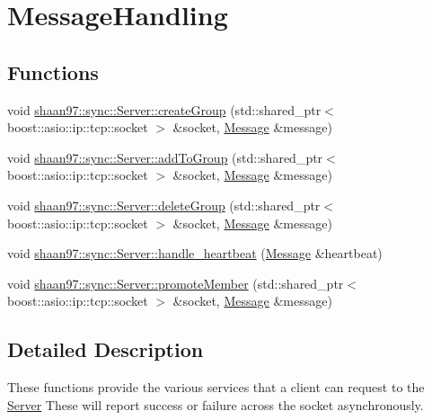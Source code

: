 \hypertarget{group___message_handling}{}\section{Message\+Handling}
\label{group___message_handling}
\subsection*{Functions}
\begin{DoxyCompactItemize}
\item 
void \hyperlink{group___message_handling_ga81c419040ae028471a5737c4c0c50e3f}{shaan97\+::sync\+::\+Server\+::create\+Group} (std\+::shared\+\_\+ptr$<$ boost\+::asio\+::ip\+::tcp\+::socket $>$ \&socket, \hyperlink{structshaan97_1_1sync_1_1_message}{Message} \&message)
\item 
void \hyperlink{group___message_handling_gaeb034e1663dff12c80bf7661f6216fe7}{shaan97\+::sync\+::\+Server\+::add\+To\+Group} (std\+::shared\+\_\+ptr$<$ boost\+::asio\+::ip\+::tcp\+::socket $>$ \&socket, \hyperlink{structshaan97_1_1sync_1_1_message}{Message} \&message)
\item 
void \hyperlink{group___message_handling_gaedbdfea1f476a81e5f1ff3b632db9bad}{shaan97\+::sync\+::\+Server\+::delete\+Group} (std\+::shared\+\_\+ptr$<$ boost\+::asio\+::ip\+::tcp\+::socket $>$ \&socket, \hyperlink{structshaan97_1_1sync_1_1_message}{Message} \&message)
\item 
void \hyperlink{group___message_handling_ga56230c5225416d342206232d3f2b8f6e}{shaan97\+::sync\+::\+Server\+::handle\+\_\+heartbeat} (\hyperlink{structshaan97_1_1sync_1_1_message}{Message} \&heartbeat)
\item 
void \hyperlink{group___message_handling_ga46e08d6ffcd45a73aac315e8393e0228}{shaan97\+::sync\+::\+Server\+::promote\+Member} (std\+::shared\+\_\+ptr$<$ boost\+::asio\+::ip\+::tcp\+::socket $>$ \&socket, \hyperlink{structshaan97_1_1sync_1_1_message}{Message} \&message)
\end{DoxyCompactItemize}


\subsection{Detailed Description}
These functions provide the various services that a client can request to the \hyperlink{classshaan97_1_1sync_1_1_server}{Server} These will report success or failure across the socket asynchronously. 

